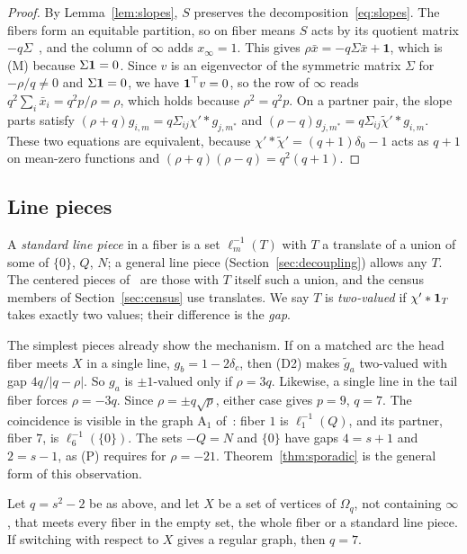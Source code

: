 \begin{proof}
By Lemma~\ref{lem:slopes}, $S$ preserves the decomposition~\eqref{eq:slopes}.
The fibers form an equitable partition, so on fiber means $S$ acts by its quotient matrix $-q\Sigma$~\cite[\S9.3]{GodsilRoyle}, and the column of $\infty$ adds $x_\infty=1$.
This gives $\rho\bar x=-q\Sigma\bar x+\mathbf1$, which is (M) because $\Sigma\mathbf 1=0$.
Since $v$ is an eigenvector of the symmetric matrix $\Sigma$ for $-\rho/q\ne0$ and $\Sigma\mathbf 1=0$, we have $\mathbf 1^\top v=0$, so the row of $\infty$ reads $q^2\sum_i\bar x_i=q^2p/\rho=\rho$, which holds because $\rho^2=q^2p$.
On a partner pair, the slope parts satisfy $(\rho+q)g_{i,m}=q\Sigma_{ij}\chi'*g_{j,m^*}$ and $(\rho-q)g_{j,m^*}=q\Sigma_{ij}\tilde\chi'*g_{i,m}$.
These two equations are equivalent, because $\chi'*\tilde\chi'=(q+1)\delta_0-1$ acts as $q+1$ on mean-zero functions and $(\rho+q)(\rho-q)=q^2(q+1)$.
\end{proof}

\subsection{Line pieces}\label{ssec:lines}
A \emph{standard line piece} in a fiber is a set $\ell_m^{-1}(T)$ with $T$ a translate of a union of some of $\{0\}$, $Q$, $N$; a general line piece (Section~\ref{sec:decoupling}) allows any $T$.
The centered pieces of~\cite{Plummer442} are those with $T$ itself such a union, and the census members of Section~\ref{sec:census} use translates.
We say $T$ is \emph{two-valued} if $\chi'*\mathbf 1_T$ takes exactly two values; their difference is the \emph{gap}.

\begin{remark}[why $q=7$]\label{rem:q7}
The simplest pieces already show the mechanism. If on a matched arc the head fiber meets $X$ in a single line,
$g_b=1-2\delta_c$, then (D2) makes $\tilde g_a$ two-valued with gap $4q/|q-\rho|$. So $g_a$ is $\pm1$-valued only if
$\rho=3q$. Likewise, a single line in the tail fiber forces $\rho=-3q$. Since $\rho=\pm q\sqrt p$, either case gives
$p=9$, $q=7$. The coincidence is visible in the graph $\mathrm A_1$ of~\cite[Table~1]{Plummer442}: fiber $1$ is
$\ell_1^{-1}(Q)$, and its partner, fiber $7$, is $\ell_6^{-1}(\{0\})$. The sets $-Q=N$ and $\{0\}$ have gaps $4=s+1$
and $2=s-1$, as (P) requires for $\rho=-21$. Theorem~\ref{thm:sporadic} is the general form of this observation.
\end{remark}

\begin{theorem}\label{thm:sporadic}
Let $q=s^2-2$ be as above, and let $X$ be a set of vertices of $\Omega_q$, not containing $\infty$, that meets every fiber in the empty set, the whole fiber or a standard line piece.
If switching with respect to $X$ gives a regular graph, then $q=7$.
\end{theorem}

